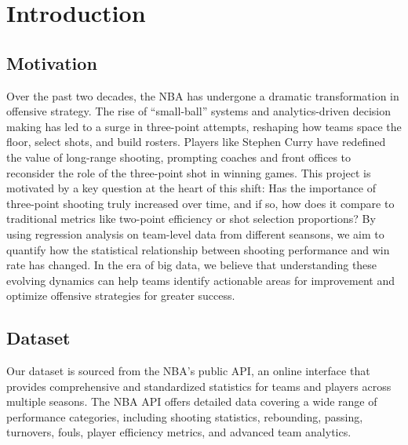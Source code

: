 \documentclass[11pt, a4paper]{article} %
\begin{document}
\section{Introduction} %
\subsection{Motivation} %
Over the past two decades, the NBA has undergone a dramatic transformation in offensive strategy. 
The rise of “small-ball” systems and analytics-driven decision making has led to a surge in 
three-point attempts, reshaping how teams space the floor, select shots, and build rosters. 
Players like Stephen Curry have redefined the value of long-range shooting, prompting coaches 
and front offices to reconsider the role of the three-point shot in winning games. This project 
is motivated by a key question at the heart of this shift: Has the importance of three-point 
shooting truly increased over time, and if so, how does it compare to traditional metrics like 
two-point efficiency or shot selection proportions? By using regression analysis on team-level 
data from different seansons, we aim to quantify how the statistical relationship 
between shooting performance and win rate has changed. In the era of big data, we believe that 
understanding these evolving dynamics can help teams identify actionable areas for improvement 
and optimize offensive strategies for greater success.
\subsection{Dataset}
Our dataset is sourced from the NBA's public API, an online interface that provides comprehensive 
and standardized statistics for teams and players across multiple seasons. The NBA API offers detailed 
data covering a wide range of performance categories, including shooting statistics, rebounding, passing, 
turnovers, fouls, player efficiency metrics, and advanced team analytics.
\end{document}
